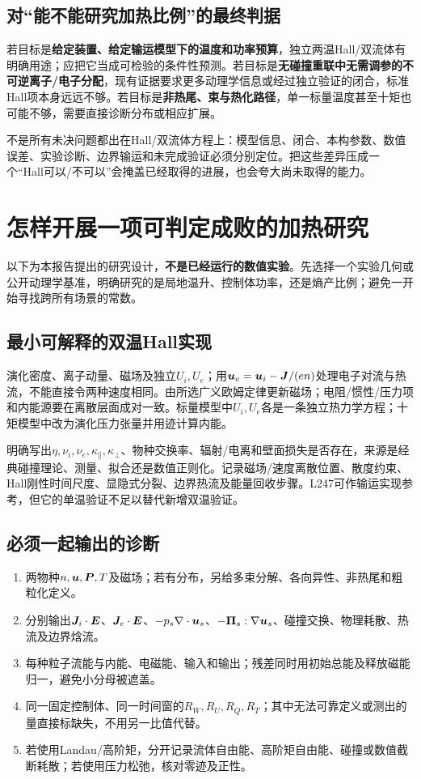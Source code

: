 \documentclass[UTF8,a4paper,11pt,openany,fontset=fandol]{ctexbook}
\begin{document}
\section{对“能不能研究加热比例”的最终判据}
若目标是\textbf{给定装置、给定输运模型下的温度和功率预算}，独立两温Hall/双流体有明确用途；应把它当成可检验的条件性预测。若目标是\textbf{无碰撞重联中无需调参的不可逆离子/电子分配}，现有证据要求更多动理学信息或经过独立验证的闭合，标准Hall项本身远远不够。若目标是\textbf{非热尾、束与热化路径}，单一标量温度甚至十矩也可能不够，需要直接诊断分布或相应扩展。

不是所有未决问题都出在Hall/双流体方程上：模型信息、闭合、本构参数、数值误差、实验诊断、边界输运和未完成验证必须分别定位。把这些差异压成一个“Hall可以/不可以”会掩盖已经取得的进展，也会夸大尚未取得的能力。



\chapter{怎样开展一项可判定成败的加热研究}
以下为本报告提出的研究设计，\textbf{不是已经运行的数值实验}。先选择一个实验几何或公开动理学基准，明确研究的是局地温升、控制体功率，还是熵产比例；避免一开始寻找跨所有场景的常数。

\section{最小可解释的双温Hall实现}
演化密度、离子动量、磁场及独立$U_i,U_e$；用$\bm{u}_e=\bm{u}_i-\bm{J}/(en)$处理电子对流与热流，不能直接令两种速度相同。由所选广义欧姆定律更新磁场；电阻/惯性/压力项和内能源要在离散层面成对一致。标量模型中$U_i,U_e$各是一条独立热力学方程；十矩模型中改为演化压力张量并用迹计算内能。

明确写出$\eta,\nu_i,\nu_e,\kappa_\parallel,\kappa_\perp$、物种交换率、辐射/电离和壁面损失是否存在，来源是经典碰撞理论、测量、拟合还是数值正则化。记录磁场/速度离散位置、散度约束、Hall刚性时间尺度、显隐式分裂、边界热流及能量回收步骤。L247可作输运实现参考，但它的单温验证不足以替代新增双温验证。

\section{必须一起输出的诊断}
\begin{enumerate}
\item 两物种$n,\bm{u},\bm{P},T$及磁场；若有分布，另给多束分解、各向异性、非热尾和粗粒化定义。
\item 分别输出$\bm{J}_i\cdot\bm{E}$、$\bm{J}_e\cdot\bm{E}$、$-p_s\nabla\cdot\bm{u}_s$、$-\bm{\Pi}_s:\nabla\bm{u}_s$、碰撞交换、物理耗散、热流及边界焓流。
\item 每种粒子流能与内能、电磁能、输入和输出；残差同时用初始总能及释放磁能归一，避免小分母被遮盖。
\item 同一固定控制体、同一时间窗的$R_W,R_U,R_Q,R_T$；其中无法可靠定义或测出的量直接标缺失，不用另一比值代替。
\item 若使用Landau/高阶矩，分开记录流体自由能、高阶矩自由能、碰撞或数值截断耗散；若使用压力松弛，核对零迹及正性。
\end{enumerate}
\end{document}
